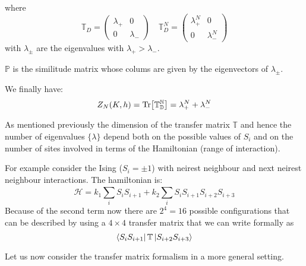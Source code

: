 \documentclass[../main/main.tex]{subfiles}
\begin{document}
where
\begin{equation}
\mathbb{T}_D =  \begin{pmatrix}
  \lambda _+   & 0 \\
  0   & \lambda _-
  \end{pmatrix}
  \quad
  \mathbb{T}_D^N =  \begin{pmatrix}
    \lambda _+^N   & 0 \\
    0   & \lambda _-^N
    \end{pmatrix}
\end{equation}
with \( \lambda _{\pm} \) are the eigenvalues with \( \lambda _+ > \lambda _- \).
\begin{remark}
\( \mathbb{P} \) is the similitude matrix whose colums are given by the eigenvectors of \(   \lambda _{\pm} \).
\end{remark}
We finally have:
\begin{equation}
  Z_N (K,h) = \Tr[\mathbb{T_D^N}] = \lambda _+^N  + \lambda _-^N
\end{equation}
\begin{remark}
As mentioned previously the dimension of the transfer matrix \( \mathbb{T} \) and hence the number of eigenvalues \( \{ \lambda  \}   \) depend both on the possible values of \( S_i \) and on the number of sites involved in terms of the Hamiltonian (range of interaction).
\end{remark}
\begin{example}
For example consider the Ising (\( S_i = \pm 1\)) with neirest neighbour and next neirest neighbour interactions. The hamiltonian is:
\begin{equation}
  \mathcal{H} = k_1 \sum_{i}^{} S_i S_{i+1} + k_2 \sum_{i}^{} S_i S_{i+1} S_{i+2} S_{i+3}
\end{equation}
Because of the second term now there are \( 2^4 = 16 \) possible configurations that can be described by using a \( 4 \times 4 \) transfer matrix that we can write formally as
\begin{equation}
  \bra{S_i S_{i+1}} \mathbb{T} \ket{S_{i+2} S_{i+3}}
\end{equation}
\end{example}
Let us now consider the transfer matrix formalism in a more general setting.
\end{document}
